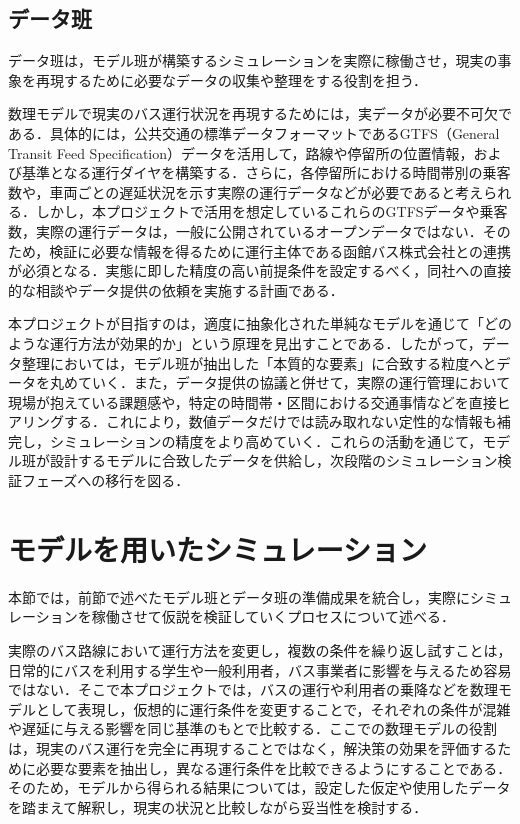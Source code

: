 \subsection{データ班}
データ班は，モデル班が構築するシミュレーションを実際に稼働させ，現実の事象を再現するために必要なデータの収集や整理をする役割を担う．

数理モデルで現実のバス運行状況を再現するためには，実データが必要不可欠である．具体的には，公共交通の標準データフォーマットであるGTFS（General Transit Feed Specification）データを活用して，路線や停留所の位置情報，および基準となる運行ダイヤを構築する．さらに，各停留所における時間帯別の乗客数や，車両ごとの遅延状況を示す実際の運行データなどが必要であると考えられる．しかし，本プロジェクトで活用を想定しているこれらのGTFSデータや乗客数，実際の運行データは，一般に公開されているオープンデータではない．そのため，検証に必要な情報を得るために運行主体である函館バス株式会社との連携が必須となる．実態に即した精度の高い前提条件を設定するべく，同社への直接的な相談やデータ提供の依頼を実施する計画である．

本プロジェクトが目指すのは，適度に抽象化された単純なモデルを通じて「どのような運行方法が効果的か」という原理を見出すことである．したがって，データ整理においては，モデル班が抽出した「本質的な要素」に合致する粒度へとデータを丸めていく．また，データ提供の協議と併せて，実際の運行管理において現場が抱えている課題感や，特定の時間帯・区間における交通事情などを直接ヒアリングする．これにより，数値データだけでは読み取れない定性的な情報も補完し，シミュレーションの精度をより高めていく．これらの活動を通じて，モデル班が設計するモデルに合致したデータを供給し，次段階のシミュレーション検証フェーズへの移行を図る．

\section{モデルを用いたシミュレーション}
本節では，前節で述べたモデル班とデータ班の準備成果を統合し，実際にシミュレーションを稼働させて仮説を検証していくプロセスについて述べる．

実際のバス路線において運行方法を変更し，複数の条件を繰り返し試すことは，日常的にバスを利用する学生や一般利用者，バス事業者に影響を与えるため容易ではない．そこで本プロジェクトでは，バスの運行や利用者の乗降などを数理モデルとして表現し，仮想的に運行条件を変更することで，それぞれの条件が混雑や遅延に与える影響を同じ基準のもとで比較する．ここでの数理モデルの役割は，現実のバス運行を完全に再現することではなく，解決策の効果を評価するために必要な要素を抽出し，異なる運行条件を比較できるようにすることである．そのため，モデルから得られる結果については，設定した仮定や使用したデータを踏まえて解釈し，現実の状況と比較しながら妥当性を検討する．

